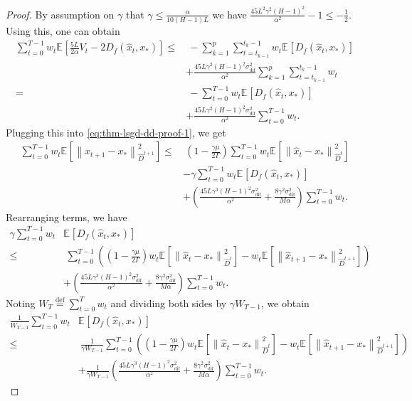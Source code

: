 \documentclass[sn-mathphys,Numbered]{sn-jnl}%
\renewcommand{\|}{\parallel}
\newcommand\ec[2][]{\ensuremath{\mathbb{E}_{#1} \left[#2\right]}}
\newcommand\ecn[3][]{\ec[#1]{\norm{#2}^2_{#3}}}
\newcommand\br[1]{\left ( #1 \right )}
\newcommand{\norm}[1]{\left\lVert#1\right\rVert}
\newcommand{\eqdef}{\overset{\text{def}}{=}}
\newcommand{\sigmaf}{\sigma_{\mathrm{dif}}}
\renewcommand {\*} {\ast}
\begin{document}
\begin{proof}
    By assumption on $\gamma$ that $\gamma \leq \frac{\alpha}{10(H-1)L}$ we have $\frac{45L^2\gamma^2 (H-1)^2}{\alpha^2} - 1 \leq -\frac{1}{2}$. Using this, one can obtain
    \begin{align*}
        \sum_{t=0}^{T-1} w_t \ec{\frac{5L}{2\alpha} V_t - 2 D_{f} (\hat{x}_t, x_\ast)} \leq&\ - \sum_{k=1}^{p} \sum_{t=t_{k-1}}^{t_k - 1} w_t\ec{D_{f} (\hat{x}_t, x_\ast)} \\ &+ \frac{45 L \gamma^2(H-1)^2\sigmaf^2 }{\alpha^2} \sum_{k=1}^{p} \sum_{t=t_{k-1}}^{t_k - 1}w_t   \\
        =&\ - \sum_{t=0}^{T-1}w_t \ec{D_{f} (\hat{x}_t, x_\ast)} \\ &+ \frac{45 L \gamma^2(H-1)^2\sigmaf^2}{\alpha^2}\sum_{t=0}^{T-1} w_t.
    \end{align*}
    Plugging this into \eqref{eq:thm-lsgd-dd-proof-1}, we get
    \begin{align*}
        \sum_{t=0}^{T-1} w_t\ecn{\hat{x}_{t+1} - x_\ast}{\hat{D}^{t+1}} \leq&\ \br{1 - \frac{\gamma \mu}{2\Gamma}}\sum_{t=0}^{T-1}w_t \ecn{\hat{x}_{t} - x_\ast}{\hat{D}^{t}} \\ &- \gamma \sum_{t=0}^{T-1} w_t\ec{D_{f} (\hat{x}_t, x_\ast)} \\ &+ \br{\frac{45 L \gamma^3(H-1)^2 \sigmaf^2}{\alpha^2}  + \frac{8 \gamma^2 \sigmaf^2}{M\alpha}}\sum_{t=0}^{T-1} w_t.
    \end{align*}
    Rearranging terms, we have
    \begin{align*}
        \gamma \sum_{t=0}^{T-1} w_t&\ec{D_{f} (\hat{x}_t, x_\ast)} \\ \leq&\ \sum_{t=0}^{T-1} \left(\br{1 - \frac{\gamma \mu}{2\Gamma}}w_t\ecn{\hat{x}_{t} - x_\ast}{\hat{D}^{t}} - w_t \ecn{\hat{x}_{t+1} - x_\ast}{\hat{D}^{t+1}}\right) \\ &+ \br{\frac{45 L \gamma^3(H-1)^2 \sigmaf^2}{\alpha^2}  + \frac{8 \gamma^2 \sigmaf^2}{M\alpha}}\sum_{t=0}^{T-1} w_t.
    \end{align*}
    Noting $W_T \eqdef \sum\limits_{t=0}^T w_t$ and dividing both sides by $\gamma W_{T-1}$, we obtain
    \begin{align*}
        \frac{1}{W_{T-1}} \sum_{t=0}^{T-1} w_t&\ec{D_{f} (\hat{x}_t, x_\ast)} \\ \leq&\ \frac{1}{\gamma W_{T-1}}\sum_{t=0}^{T-1} \left(\br{1 - \frac{\gamma \mu}{2\Gamma}}w_t\ecn{\hat{x}_{t} - x_\ast}{\hat{D}^{t}} - w_t \ecn{\hat{x}_{t+1} - x_\ast}{\hat{D}^{t+1}}\right) \\ &+ \frac{1}{\gamma W_{T-1}}\br{\frac{45 L \gamma^3(H-1)^2 \sigmaf^2}{\alpha^2}  + \frac{8 \gamma^2 \sigmaf^2}{M\alpha}}\sum_{t=0}^{T-1} w_t.

\end{align*}
\end{proof}
\end{document}
